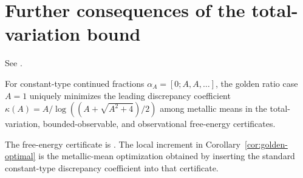 \section{Further consequences of the total-variation bound}\label{app:tv-extensions}

\begin{theorem}\label{thm:free-energy-certificate}
See \cite[Theorem~A.1]{MaZhang2026Nonlinearity}.
\end{theorem}

\begin{corollary}\label{cor:golden-optimal}
For constant-type continued fractions $\alpha_A=[0;A,A,\dots]$, the golden
ratio case $A=1$ uniquely minimizes the leading discrepancy coefficient
$\kappa(A)=A/\log((A+\sqrt{A^2+4})/2)$ among metallic means in the
total-variation, bounded-observable, and observational free-energy
certificates.
\end{corollary}

\begin{remark}
The free-energy certificate is \cite[Theorem~A.1]{MaZhang2026Nonlinearity}.
The local increment in Corollary~\ref{cor:golden-optimal} is the metallic-mean
optimization obtained by inserting the standard constant-type discrepancy
coefficient into that certificate.
\end{remark}
